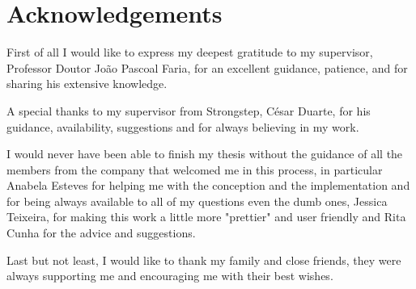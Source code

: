 \chapter*{Acknowledgements}

First of all I would like to express my deepest gratitude to my supervisor, Professor Doutor João Pascoal Faria, for an excellent guidance, patience, and for sharing his extensive knowledge.

A special thanks to my supervisor from Strongstep, César Duarte, for his guidance, availability, suggestions and for always believing in my work.

I would never have been able to finish my thesis without the guidance of all the members from the company that welcomed me in this process, in particular Anabela Esteves for helping me with the conception and the implementation and for being always available to all of my questions even the dumb ones, Jessica Teixeira, for making this work a little more "prettier" and user friendly and Rita Cunha for the advice and suggestions.

Last but not least, I would like to thank my family and close friends, they were always supporting me and encouraging me with their best wishes.
\vspace{10mm}
